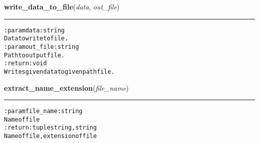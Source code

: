     \label{hal:files:models:Document:write_data_to_file}

    \vspace{0.5ex}

\hspace{.8\funcindent}\begin{boxedminipage}{\funcwidth}

    \raggedright \textbf{write\_data\_to\_file}(\textit{data}, \textit{out\_file})

    \vspace{-1.5ex}

    \rule{\textwidth}{0.5\fboxrule}
\setlength{\parskip}{2ex}
\begin{alltt}

:param data: string
    Data to write to file.
:param out\_file: string
    Path to output file.
:return: void
    Writes given data to given path file.
\end{alltt}

\setlength{\parskip}{1ex}
    \end{boxedminipage}

    \label{hal:files:models:Document:extract_name_extension}

    \vspace{0.5ex}

\hspace{.8\funcindent}\begin{boxedminipage}{\funcwidth}

    \raggedright \textbf{extract\_name\_extension}(\textit{file\_name})

    \vspace{-1.5ex}

    \rule{\textwidth}{0.5\fboxrule}
\setlength{\parskip}{2ex}
\begin{alltt}

:param file\_name: string
    Name of file
:return: tuple string, string
    Name of file, extension of file
\end{alltt}

\setlength{\parskip}{1ex}
    \end{boxedminipage}


